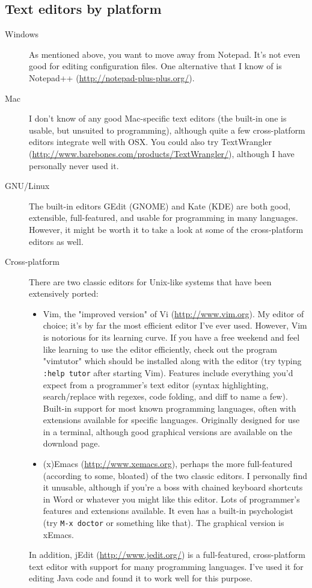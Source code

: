 \documentclass{article}
\begin{document}
\subsection{Text editors by platform}
\begin{description}
    \item[Windows] As mentioned above, you want to move away from Notepad. It's not even good for editing configuration files. One alternative that I know of is Notepad++ (\url{http://notepad-plus-plus.org/}). 
    \item[Mac] I don't know of any good Mac-specific text editors (the built-in one is usable, but unsuited to programming), although quite a few cross-platform editors integrate well with OSX. You could also try TextWrangler (\url{http://www.barebones.com/products/TextWrangler/}), although I have personally never used it.
    \item[GNU/Linux] The built-in editors GEdit (GNOME) and Kate (KDE) are both good, extensible, full-featured, and usable for programming in many languages. However, it might be worth it to take a look at some of the cross-platform editors as well.
    \item[Cross-platform] There are two classic editors for Unix-like systems that have been extensively ported: 
        \begin{itemize}
            \item Vim, the "improved version" of Vi (\url{http://www.vim.org}). My editor of choice; it's by far the most efficient editor I've ever used. However, Vim is notorious for its learning curve. If you have a free weekend and feel like learning to use the editor efficiently, check out the program "vimtutor" which should be installed along with the editor (try typing \texttt{:help tutor} after starting Vim). Features include everything you'd expect from a programmer's text editor (syntax highlighting, search/replace with regexes, code folding, and diff to name a few). Built-in support for most known programming languages, often with extensions available for specific languages. Originally designed for use in a terminal, although good graphical versions are available on the download page.
            \item (x)Emacs (\url{http://www.xemacs.org}), perhaps the more full-featured (according to some, bloated) of the two classic editors. I personally find it unusable, although if you're a boss with chained keyboard shortcuts in Word or whatever you might like this editor. Lots of programmer's features and extensions available. It even has a built-in psychologist (try \texttt{M-x doctor} or something like that). The graphical version is xEmacs.
        \end{itemize}
        In addition, jEdit (\url{http://www.jedit.org/}) is a full-featured, cross-platform text editor with support for many programming languages. I've used it for editing Java code and found it to work well for this purpose.
\end{description}
\end{document}
